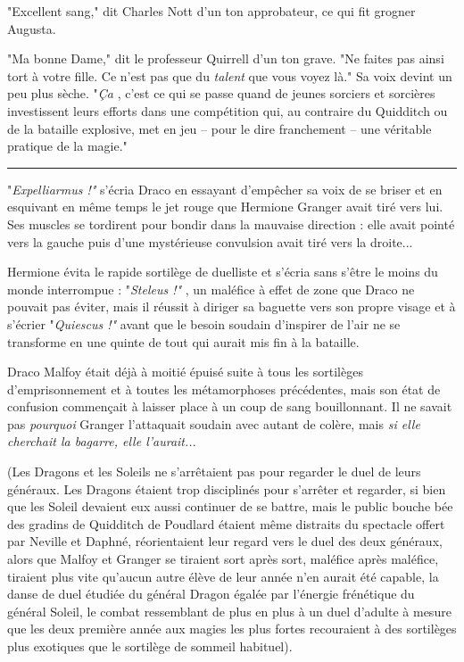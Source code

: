 "Excellent sang," dit Charles Nott d'un ton approbateur, ce qui fit grogner Augusta.

"Ma bonne Dame," dit le professeur Quirrell d'un ton grave. "Ne faites pas ainsi tort à votre fille. Ce n'est pas que du \emph{talent}  que vous voyez là." Sa voix devint un peu plus sèche. "\emph{Ça} , c'est ce qui se passe quand de jeunes sorciers et sorcières investissent leurs efforts dans une compétition qui, au contraire du Quidditch ou de la bataille explosive, met en jeu – pour le dire franchement – une véritable pratique de la magie."
\par\noindent\rule{\textwidth}{0.4pt}
"\emph{Expelliarmus !"}  s'écria Draco en essayant d'empêcher sa voix de se briser et en esquivant en même temps le jet rouge que Hermione Granger avait tiré vers lui. Ses muscles se tordirent pour bondir dans la mauvaise direction : elle avait pointé vers la gauche puis d'une mystérieuse convulsion avait tiré vers la droite...

Hermione évita le rapide sortilège de duelliste et s'écria sans s'être le moins du monde interrompue : "\emph{Steleus !"} , un maléfice à effet de zone que Draco ne pouvait pas éviter, mais il réussit à diriger sa baguette vers son propre visage et à s'écrier "\emph{Quiescus !" } avant que le besoin soudain d'inspirer de l'air ne se transforme en une quinte de tout qui aurait mis fin à la bataille.

Draco Malfoy était déjà à moitié épuisé suite à tous les sortilèges d'emprisonnement et à toutes les métamorphoses précédentes, mais son état de confusion commençait à laisser place à un coup de sang bouillonnant. Il ne savait pas \emph{pourquoi}  Granger l'attaquait soudain avec autant de colère, mais \emph{si elle cherchait la bagarre, elle l'aurait...} 

(Les Dragons et les Soleils ne s'arrêtaient pas pour regarder le duel de leurs généraux. Les Dragons étaient trop disciplinés pour s'arrêter et regarder, si bien que les Soleil devaient eux aussi continuer de se battre, mais le public bouche bée des gradins de Quidditch de Poudlard étaient même distraits du spectacle offert par Neville et Daphné, réorientaient leur regard vers le duel des deux généraux, alors que Malfoy et Granger se tiraient sort après sort, maléfice après maléfice, tiraient plus vite qu'aucun autre élève de leur année n'en aurait été capable, la danse de duel étudiée du général Dragon égalée par l'énergie frénétique du général Soleil, le combat ressemblant de plus en plus à un duel d'adulte à mesure que les deux première année aux magies les plus fortes recouraient à des sortilèges plus exotiques que le sortilège de sommeil habituel).

